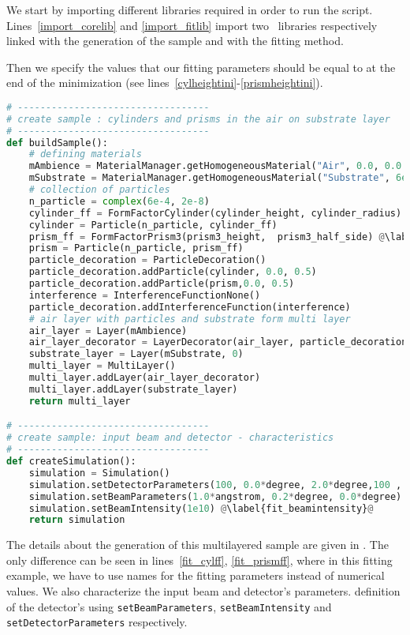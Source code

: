 We start by importing different libraries required in order to run the script.
Lines~\ref{import_corelib} and \ref{import_fitlib} import two
\BornAgain\ libraries respectively linked with the generation of the
sample and with the fitting method.  

Then we specify the values that our fitting parameters should be equal
to at the end of the minimization (see lines~\ref{cylheightini}-\ref{prismheightini}).


\begin{lstlisting}[language=python, style=eclipseboxed, name=exfit,nolol]
# ----------------------------------
# create sample : cylinders and prisms in the air on substrate layer
# ----------------------------------
def buildSample(): 
    # defining materials
    mAmbience = MaterialManager.getHomogeneousMaterial("Air", 0.0, 0.0 )
    mSubstrate = MaterialManager.getHomogeneousMaterial("Substrate", 6e-6, 2e-8 )
    # collection of particles
    n_particle = complex(6e-4, 2e-8)
    cylinder_ff = FormFactorCylinder(cylinder_height, cylinder_radius) @\label{fit_cylff}@
    cylinder = Particle(n_particle, cylinder_ff)
    prism_ff = FormFactorPrism3(prism3_height,  prism3_half_side) @\label{fit_prismff}@
    prism = Particle(n_particle, prism_ff)
    particle_decoration = ParticleDecoration()
    particle_decoration.addParticle(cylinder, 0.0, 0.5)
    particle_decoration.addParticle(prism,0.0, 0.5)  
    interference = InterferenceFunctionNone()
    particle_decoration.addInterferenceFunction(interference)
    # air layer with particles and substrate form multi layer
    air_layer = Layer(mAmbience)
    air_layer_decorator = LayerDecorator(air_layer, particle_decoration)
    substrate_layer = Layer(mSubstrate, 0)
    multi_layer = MultiLayer()
    multi_layer.addLayer(air_layer_decorator)
    multi_layer.addLayer(substrate_layer)
    return multi_layer

# ----------------------------------
# create sample: input beam and detector - characteristics
# ----------------------------------
def createSimulation():
    simulation = Simulation()
    simulation.setDetectorParameters(100, 0.0*degree, 2.0*degree,100 , 0.0*degree, 2.0*degree)
    simulation.setBeamParameters(1.0*angstrom, 0.2*degree, 0.0*degree)
    simulation.setBeamIntensity(1e10) @\label{fit_beamintensity}@
    return simulation
\end{lstlisting}

The details about the generation of this multilayered sample are given in .
The only difference can be seen in lines~\ref{fit_cylff},
\ref{fit_prismff}, where in this fitting example, we have to use names
for the fitting parameters instead of numerical values.
We also characterize the input beam and detector's parameters. 
 definition of the detector's using  \texttt{setBeamParameters},
 \texttt{setBeamIntensity} and \texttt{setDetectorParameters}
 respectively.\\

